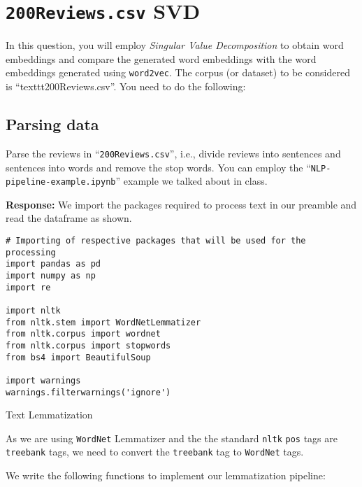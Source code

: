 \documentclass[12pt, letterpaper]{article}
\newcommand{\mybox}[1]{\par\noindent\colorbox{shadecolor}
{\parbox{\dimexpr\textwidth-2\fboxsep\relax}{#1}}}
\begin{document}
\section{\texttt{200Reviews.csv} SVD}

\mybox{In this question, you will employ \textit{Singular Value Decomposition} to obtain word embeddings and compare the generated word embeddings with the word embeddings generated using \texttt{word2vec}. 
The corpus (or dataset) to be considered is ``texttt{200Reviews.csv}''. You need to do the following:}

\subsection{Parsing data}
\mybox{Parse the reviews in ``\texttt{200Reviews.csv}'', i.e., divide reviews into sentences and sentences into words and remove the stop words. You can employ the ``\texttt{NLP-pipeline-example.ipynb}'' example we talked about in class.}

\textbf{Response:} We import the packages required to process text in our preamble and read the dataframe as shown.

\begin{mdframed}[backgroundcolor=shadecolor]
\begin{verbatim}
# Importing of respective packages that will be used for the processing
import pandas as pd
import numpy as np
import re

import nltk
from nltk.stem import WordNetLemmatizer
from nltk.corpus import wordnet
from nltk.corpus import stopwords
from bs4 import BeautifulSoup

import warnings
warnings.filterwarnings('ignore')
\end{verbatim}
\end{mdframed}

{\large Text Lemmatization}

As we are using \texttt{WordNet} Lemmatizer and the the standard \texttt{nltk} \texttt{pos} tags are \texttt{treebank} tags, we need to convert the \texttt{treebank} tag to \texttt{WordNet} tags.

We write the following functions to implement our lemmatization pipeline:
\end{document}
